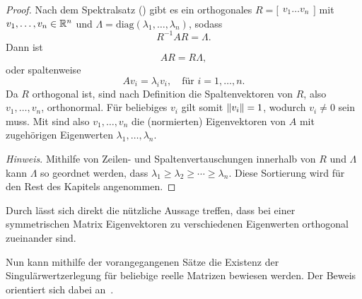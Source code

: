 \begin{proof}
    Nach dem Spektralsatz () gibt es ein orthogonales 
    \(
    R=
    \big[
    \begin{matrix}
        v_1 \dots v_n
    \end{matrix}
    \big]
    \)
    mit
    \(v_1,\ldots,v_n \in \mathbb{R}^{n}\) 
    und 
    \(\Lambda = \text{diag}(\lambda_1,\ldots,\lambda_n)\), sodass
    \begin{equation*}
        R^{-1}AR = \Lambda.
    \end{equation*}
    Dann ist
    \begin{equation*}
        AR = R\Lambda,
    \end{equation*} 
    oder spaltenweise
    \begin{equation*}
        Av_i = {\lambda}_i v_i, \quad \text{für } i = 1,\ldots,n.
    \end{equation*}
    Da \(R\) orthogonal ist, sind nach Definition die Spaltenvektoren von \(R\), also \(v_1,\ldots,v_n\), orthonormal.
    Für beliebiges \(v_i\) gilt somit \(\lVert v_i\rVert = 1\), wodurch \(v_i \neq 0\) sein muss.
    Mit  sind also \(v_1,\ldots,v_n\) die (normierten) Eigenvektoren von \(A\) mit zugehörigen Eigenwerten \(\lambda_1,\ldots,\lambda_n\).
    
    \textit{Hinweis}. Mithilfe von Zeilen- und Spaltenvertauschungen innerhalb von \(R\) und \(\Lambda\) kann \(\Lambda\) so geordnet werden, dass \(\lambda_1 \geq \lambda_2 \geq \cdots \geq \lambda_n\).
Diese Sortierung wird für den Rest des Kapitels angenommen.
\end{proof}
\begin{remark}
    Durch  lässt sich direkt die nützliche Aussage treffen, dass bei einer symmetrischen Matrix Eigenvektoren zu verschiedenen Eigenwerten orthogonal zueinander sind. 
\end{remark}
Nun kann mithilfe der vorangegangenen Sätze die Existenz der Singulärwertzerlegung für beliebige reelle Matrizen bewiesen werden.
Der Beweis orientiert sich dabei an~\cite{chenLecture5Singular2020}.

